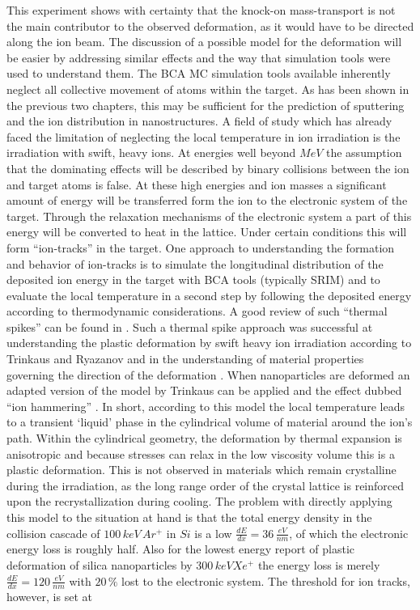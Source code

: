 \documentclass[12pt,
paper=a4,				
DIV=calc,		  %
BCOR=16mm,	  %
headinclude,
openany
]{scrbook}
\begin{document}
This experiment shows with certainty that the knock-on mass-transport is not the main contributor to the observed deformation, as it would have to be directed along the ion beam. The discussion of a possible model for the deformation will be easier by addressing similar effects and the way that simulation tools were used to understand them. The BCA MC simulation tools available inherently neglect all collective movement of atoms within the target. As has been shown in the previous two chapters, this may be sufficient for the prediction of sputtering and the ion distribution in nanostructures. A field of study which has already faced the limitation of neglecting the local temperature in ion irradiation is the irradiation with swift, heavy ions. At energies well beyond $MeV$ the assumption that the dominating effects will be described by binary collisions between the ion and target atoms is false. At these high energies and ion masses a significant amount of energy will be transferred form the ion to the electronic system of the target. Through the relaxation mechanisms of the electronic system a part of this energy will be converted to heat in the lattice. Under certain conditions this will form ``ion-tracks'' in the target. One approach to understanding the formation and behavior of ion-tracks is to simulate the longitudinal distribution of the deposited ion energy in the target with BCA tools (typically SRIM) and to evaluate the local temperature in a second step by following the deposited energy according to thermodynamic considerations. A good review of such ``thermal spikes'' can be found in \cite{wesch_effect_2004}. Such a thermal spike approach was successful at understanding the plastic deformation by swift heavy ion irradiation according to Trinkaus and Ryazanov \cite{trinkaus_viscoelastic_1995} and in the understanding of material properties governing the direction of the deformation \cite{hedler_amorphous_2004,hedler_boundary_2005}. When nanoparticles are deformed \cite{snoeks_colloidal_2000,snoeks_colloidal_2001,van_dillen_anisotropic_2001,dillen_energy-dependent_2001,dillen_ion_2003,dillen_ion_2004} an adapted version of the model by Trinkaus can be applied and the effect dubbed ``ion hammering'' \cite{klaumunzer_ion_2004}. In short, according to this model the local temperature leads to a transient `liquid' phase in the cylindrical volume of material around the ion's path. Within the cylindrical geometry, the deformation by thermal expansion is anisotropic and because stresses can relax in the low viscosity volume this is a plastic deformation. This is not observed in materials which remain crystalline during the irradiation, as the long range order of the crystal lattice is reinforced upon the recrystallization during cooling. The problem with directly applying this model to the situation at hand is that the total energy density in the collision cascade of $100\,keV\,Ar^+$ in $Si$ is a low $\frac{dE}{dx} = 36\,\frac{eV}{nm}$, of which the electronic energy loss is roughly half. Also for the lowest energy report of plastic deformation of silica nanoparticles by $300\,keV Xe^+$ \cite{dillen_ion_2003} the energy loss is merely $\frac{dE}{dx} = 120\,\frac{eV}{nm}$ with $20\,\%$ lost to the electronic system. The threshold for ion tracks, however, is set at 
\end{document}
